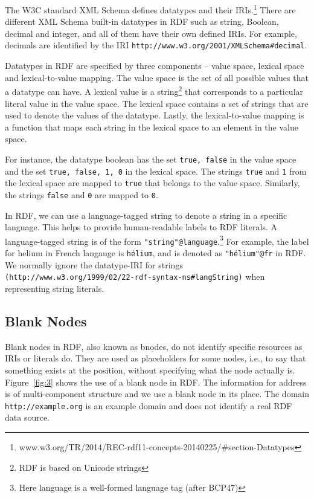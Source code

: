 The W3C standard XML Schema defines datatypes and their IRIs.\footnote{www.w3.org/TR/2014/REC-rdf11-concepts-20140225/\#section-Datatypes} There are different XML Schema built-in datatypes in RDF such as string, Boolean, decimal and integer, and all of them have their own defined IRIs. For example, decimals are identified by the IRI \texttt{http://www.w3.org/2001/XMLSchema\#decimal}. 

Datatypes in RDF are specified by three components – value space, lexical space and lexical-to-value mapping. The value space is the set of all possible values that a datatype can have. A lexical value is a string\footnote{RDF is based on Unicode strings} that corresponds to a particular literal value in the value space. The lexical space contains a set of strings that are used to denote the values of the datatype. Lastly, the lexical-to-value mapping is a function that maps each string in the lexical space to an element in the value space. 

For instance, the datatype boolean has the set \texttt{{true, false}} in the value space and the set \texttt{{true, false, 1, 0}} in the lexical space. The strings \texttt{true} and \texttt{1} from the lexical space are mapped to \texttt{true} that belongs to the value space. Similarly, the strings \texttt{false} and \texttt{0} are mapped to \texttt{0}. 

In RDF, we can use a language-tagged string to denote a string in a specific language. This helps to provide human-readable labels to RDF literals. A language-tagged string is of the form \texttt{"string"@language}.\footnote{Here language is a well-formed language tag (after BCP47)} For example, the label for helium in French langauge is \texttt{hélium}, and is denoted as \texttt{"hélium"@fr} in RDF. We normally ignore the datatype-IRI for strings \texttt{(http://www.w3.org/1999/02/22-rdf-syntax-ns\#langString)} when representing string literals. 

\subsection{Blank Nodes}
Blank nodes in RDF, also known as bnodes, do not identify specific resources as IRIs or literals do. They are used as placeholders for some nodes, i.e., to say that something exists at the position, without specifying what the node actually is. Figure~\ref{fig:3} shows the use of a blank node in RDF. The information for address is of multi-component structure and we use a blank node in its place. The domain \texttt{http://example.org} is an example domain and does not identify a real RDF data source.

